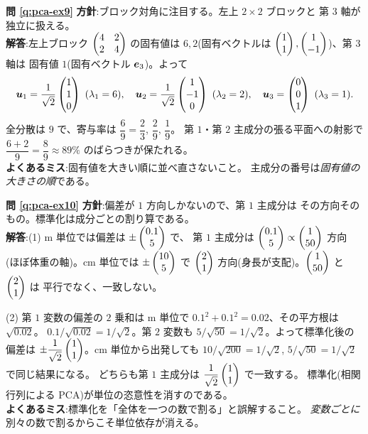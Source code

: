 \bigskip
\noindent\textbf{問 \ref{q:pca-ex9}}\quad
\textbf{方針}:ブロック対角に注目する。左上 $2 \times 2$ ブロックと
第 $3$ 軸が独立に扱える。\\
\textbf{解答}:左上ブロック $\begin{pmatrix}4 & 2 \\ 2 & 4\end{pmatrix}$ の固有値は
$6, 2$(固有ベクトルは $\begin{pmatrix}1 \\ 1\end{pmatrix}, \begin{pmatrix}1 \\ -1\end{pmatrix}$)、第 $3$ 軸は
固有値 $1$(固有ベクトル $\bm{e}_3$)。よって
\[
\vect{u}_1 = \frac{1}{\sqrt{2}}\mat{1 \\ 1 \\ 0}\ (\lambda_1 = 6), \quad
\vect{u}_2 = \frac{1}{\sqrt{2}}\mat{1 \\ -1 \\ 0}\ (\lambda_2 = 2), \quad
\vect{u}_3 = \mat{0 \\ 0 \\ 1}\ (\lambda_3 = 1).
\]
全分散は $9$ で、寄与率は
$\dfrac{6}{9} = \dfrac{2}{3}$, $\dfrac{2}{9}$, $\dfrac{1}{9}$。
第 $1$・第 $2$ 主成分の張る平面への射影で
$\dfrac{6 + 2}{9} = \dfrac{8}{9} \approx 89\%$ のばらつきが保たれる。\\
\textbf{よくあるミス}:固有値を大きい順に並べ直さないこと。
主成分の番号は\emph{固有値の大きさの順}である。

\bigskip
\noindent\textbf{問 \ref{q:pca-ex10}}\quad
\textbf{方針}:偏差が $1$ 方向しかないので、第 $1$ 主成分は
その方向そのもの。標準化は成分ごとの割り算である。\\
\textbf{解答}:(1) m 単位では偏差は $\pm\begin{pmatrix}0.1 \\ 5\end{pmatrix}$ で、
第 $1$ 主成分は $\begin{pmatrix}0.1 \\ 5\end{pmatrix} \propto \begin{pmatrix}1 \\ 50\end{pmatrix}$ 方向
(ほぼ体重の軸)。cm 単位では $\pm\begin{pmatrix}10 \\ 5\end{pmatrix}$ で
$\begin{pmatrix}2 \\ 1\end{pmatrix}$ 方向(身長が支配)。$\begin{pmatrix}1 \\ 50\end{pmatrix}$ と $\begin{pmatrix}2 \\ 1\end{pmatrix}$ は
平行でなく、一致しない。

(2) 第 $1$ 変数の偏差の $2$ 乗和は m 単位で
$0.1^2 + 0.1^2 = 0.02$、その平方根は $\sqrt{0.02}$。
$0.1 / \sqrt{0.02} = 1/\sqrt{2}$。第 $2$ 変数も
$5 / \sqrt{50} = 1/\sqrt{2}$。よって標準化後の偏差は
$\pm\dfrac{1}{\sqrt{2}}\begin{pmatrix}1 \\ 1\end{pmatrix}$。cm 単位から出発しても
$10/\sqrt{200} = 1/\sqrt{2}$, $5/\sqrt{50} = 1/\sqrt{2}$ で同じ結果になる。
どちらも第 $1$ 主成分は $\dfrac{1}{\sqrt{2}}\begin{pmatrix}1 \\ 1\end{pmatrix}$ で一致する。
標準化(相関行列による PCA)が単位の恣意性を消すのである。\\
\textbf{よくあるミス}:標準化を「全体を一つの数で割る」と誤解すること。
\emph{変数ごとに}別々の数で割るからこそ単位依存が消える。

